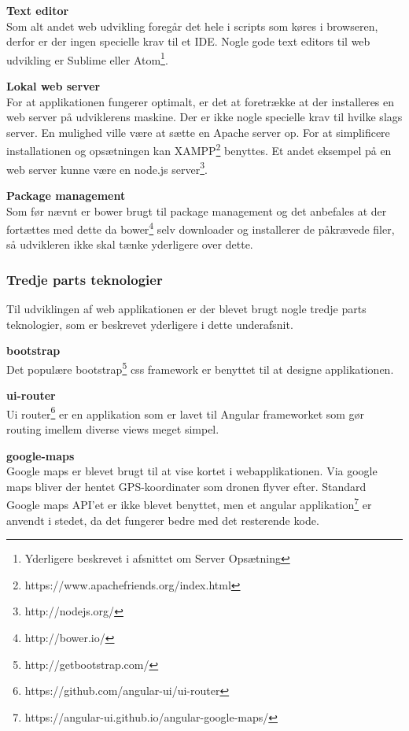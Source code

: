 \textbf{Text editor}\\
Som alt andet web udvikling foregår det hele i scripts som køres i browseren, derfor er der ingen specielle krav til et IDE. Nogle gode text editors til web udvikling er Sublime eller Atom\footnote{Yderligere beskrevet i afsnittet om Server Opsætning}.

\textbf{Lokal web server}\\
For at applikationen fungerer optimalt, er det at foretrække at der installeres en web server på udviklerens maskine. Der er ikke nogle specielle krav til hvilke slags server. En mulighed ville være at sætte en Apache server op. For at simplificere installationen og opsætningen kan XAMPP\footnote{https://www.apachefriends.org/index.html} benyttes. Et andet eksempel på en web server kunne være en node.js server\footnote{http://nodejs.org/}. 



\newpage

\textbf{Package management}\\
Som før nævnt er bower brugt til package management og det anbefales at der fortættes med dette da bower\footnote{http://bower.io/} selv downloader og installerer de påkrævede filer, så udvikleren ikke skal tænke yderligere over dette.  


\subsubsection*{Tredje parts teknologier}
Til udviklingen af web applikationen er der blevet brugt nogle tredje parts teknologier, som er beskrevet yderligere i dette underafsnit.

\textbf{bootstrap}\\
Det populære bootstrap\footnote{http://getbootstrap.com/} css framework er benyttet til at designe applikationen.

\textbf{ui-router}\\
Ui router\footnote{https://github.com/angular-ui/ui-router} er en applikation som er lavet til Angular frameworket som gør routing imellem diverse views meget simpel. 

\textbf{google-maps}\\
Google maps er blevet brugt til at vise kortet i webapplikationen. Via google maps bliver der hentet GPS-koordinater som dronen flyver efter. Standard Google maps API'et er ikke blevet benyttet, men et angular applikation\footnote{https://angular-ui.github.io/angular-google-maps/} er anvendt i stedet, da det fungerer bedre med det resterende kode.

\newpage